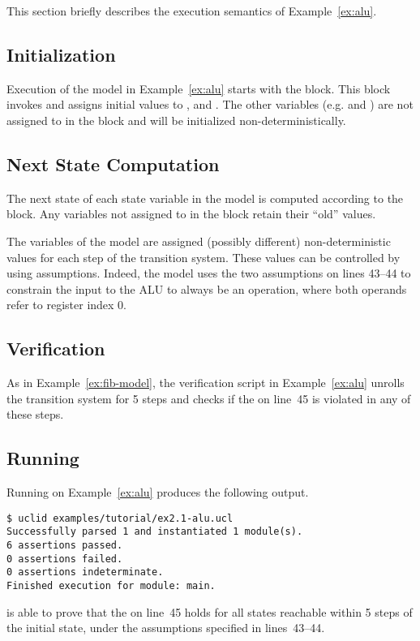 This section briefly describes the execution semantics of Example~\ref{ex:alu}.

\subsection{Initialization}
Execution of the model in Example~\ref{ex:alu} starts with the  block. This block invokes  and assigns initial values to ,  and . The other variables (e.g.  and ) are not assigned to in the  block and will be initialized non-deterministically.

\subsection{Next State Computation}
The next state of each state variable in the model is computed according to the  block. Any variables not assigned to in the  block retain their ``old'' values.

The  variables of the model are assigned (possibly different) non-deterministic values for each step of the transition system. These values can be controlled by using assumptions. Indeed, the model uses the two assumptions on lines 43--44 to constrain the input to the ALU to always be an  operation, where both operands refer to register index 0.

\subsection{Verification}
As in Example~\ref{ex:fib-model}, the verification script in Example~\ref{ex:alu} unrolls the transition system for 5 steps and checks if the  on line~45 is violated in any of these steps.

\subsection{Running \uclid{}}

Running \uclid{} on Example~\ref{ex:alu} produces the following output.

\begin{Verbatim}[frame=single, samepage=true]
$ uclid examples/tutorial/ex2.1-alu.ucl
Successfully parsed 1 and instantiated 1 module(s).
6 assertions passed.
0 assertions failed.
0 assertions indeterminate.
Finished execution for module: main.
\end{Verbatim}

\uclid{} is able to prove that the  on line~45 holds for all states reachable within 5 steps of the initial state, under the assumptions specified in lines~43--44.
